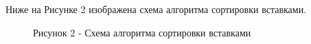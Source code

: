 \documentclass[14pt, a4paper]{extarticle}
\begin{document}
	\clearpage
	Ниже на Рисунке 2 изображена схема алгоритма сортировки вставками.
	\begin{figure}[h!]
		\caption*{Рисунок 2 - Схема алгоритма сортировки вставками}
	\end{figure}
\end{document}

